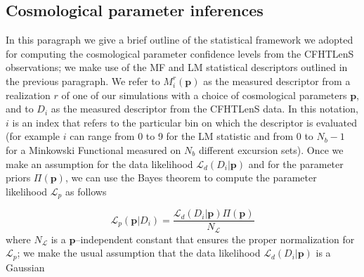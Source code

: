 \documentclass[reprint,aps,prd,superscriptaddress,showkeys,showpacs]{revtex4-1}
\begin{document}
\subsection{Cosmological parameter inferences}
\label{cosmostats}
In this paragraph we give a brief outline of the statistical framework we adopted for computing the cosmological parameter confidence levels from the CFHTLenS observations; we make use of the MF and LM statistical descriptors outlined in the previous paragraph. We refer to $M_i^r(\mathbf{p})$ as the measured descriptor from a realization $r$ of one of our simulations with a choice of cosmological parameters $\mathbf{p}$, and to $D_i$ as the measured descriptor from the CFHTLenS data. In this notation, $i$ is an index that refers to the particular bin on which the descriptor is evaluated (for example $i$ can range from 0 to 9 for the LM statistic and from 0 to $N_b-1$ for a Minkowski Functional measured on $N_b$ different excursion sets). Once we make an assumption for the data likelihood $\mathcal{L}_d(D_i\vert \mathbf{p})$ and for the parameter priors $\Pi(\mathbf{p})$, we can use the Bayes theorem to compute the parameter likelihood $\mathcal{L}_p$ as follows

\begin{equation}
\label{parameterlikelihood}
\mathcal{L}_p(\mathbf{p}\vert D_i) = \frac{\mathcal{L}_d(D_i\vert \mathbf{p})\Pi(\mathbf{p})}{N_{\mathcal{L}}}
\end{equation}
%
where $N_{\mathcal{L}}$ is a $\mathbf{p}$--independent constant that ensures the proper normalization for $\mathcal{L}_p$; we make the usual assumption that the data likelihood $\mathcal{L}_d(D_i\vert \mathbf{p})$ is a Gaussian
\end{document}
